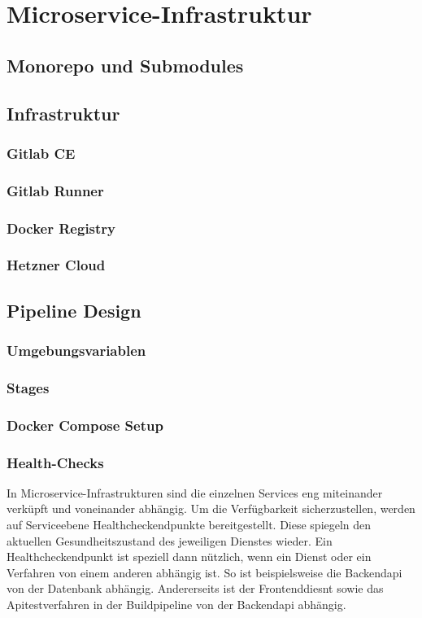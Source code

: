 \chapter{Microservice-Infrastruktur}

\section{Monorepo und Submodules}

\section{Infrastruktur}
\subsection{Gitlab CE}
\subsection{Gitlab Runner}
\subsection{Docker Registry}
\subsection{Hetzner Cloud}

\section{Pipeline Design}
\subsection{Umgebungsvariablen}

\subsection{Stages}
\subsection{Docker Compose Setup}

\subsection{Health-Checks}
In Microservice-Infrastrukturen sind die einzelnen Services eng miteinander verküpft
und voneinander abhängig. Um die Verfügbarkeit sicherzustellen, werden auf
Serviceebene Healthcheckendpunkte bereitgestellt. Diese spiegeln den aktuellen
Gesundheitszustand des jeweiligen Dienstes wieder. Ein Healthcheckendpunkt
ist speziell dann nützlich, wenn ein Dienst oder ein Verfahren von einem anderen
abhängig ist. So ist beispielsweise die Backendapi von der Datenbank
abhängig. Andererseits ist der Frontenddiesnt sowie das Apitestverfahren
in der Buildpipeline von der Backendapi abhängig. 

